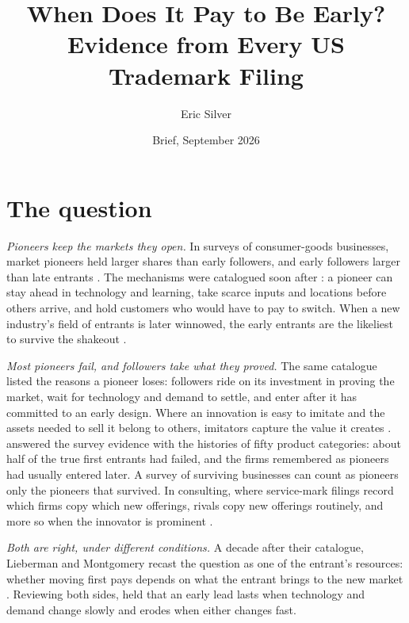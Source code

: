 
\graphicspath{{../../}}
\makeatletter{}\makeatother
\title{\bfseries When Does It Pay to Be Early?\\
\large Evidence from Every US Trademark Filing}
\author{Eric Silver}
\date{Brief, September 2026}


\maketitle

\section*{The question}

\emph{Pioneers keep the markets they open.} In surveys of
consumer-goods businesses, market pioneers held larger shares than
early followers, and early followers larger than late entrants
\citep{RobinsonFornell1985}. The mechanisms were catalogued soon after
\citep{LiebermanMontgomery1988}: a pioneer can stay ahead in technology
and learning, take scarce inputs and locations before others arrive,
and hold customers who would have to pay to switch. When a new
industry's field of entrants is later winnowed, the early entrants are
the likeliest to survive the shakeout \citep{KlepperMiller1995,
Klepper1997}.

\emph{Most pioneers fail, and followers take what they proved.} The
same catalogue listed the reasons a pioneer loses: followers ride on
its investment in proving the market, wait for technology and demand
to settle, and enter after it has committed to an early design. Where
an innovation is easy to imitate and the assets needed to sell it
belong to others, imitators capture the value it creates
\citep{Teece1986}. \citet{GolderTellis1993} answered the survey
evidence with the histories of fifty product categories: about half of
the true first entrants had failed, and the firms remembered as
pioneers had usually entered later. A survey of surviving businesses
can count as pioneers only the pioneers that survived. In consulting,
where service-mark filings record which firms copy which new offerings,
rivals copy new offerings routinely, and more so when the innovator is
prominent \citep{SemadeniAnderson2010}.

\emph{Both are right, under different conditions.} A decade after their
catalogue, Lieberman and Montgomery recast the question as one of the
entrant's resources: whether moving first pays depends on what the
entrant brings to the new market \citep{LiebermanMontgomery1998}.
Reviewing both sides, \citet{SuarezLanzolla2007} held that an early
lead lasts when technology and demand change slowly and erodes when
either changes fast.

